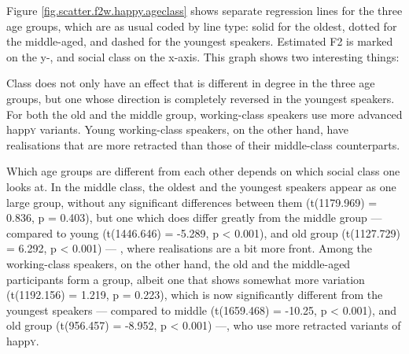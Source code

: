 Figure \ref{fig.scatter.f2w.happy.ageclass} shows separate regression lines for the three age groups, which are as usual coded by line type: solid for the oldest, dotted for the middle-aged, and dashed for the youngest speakers.
Estimated F2 is marked on the y-, and social class on the x-axis.
This graph shows two interesting things:
\begin{inparaenum}[(1)]
	\item Class does not only have an effect that is different in degree in the three age groups, but one whose direction is completely reversed in the youngest speakers.
	For both the old and the middle group, working-class speakers use more advanced happ\textsc{y} variants.
	Young working-class speakers, on the other hand, have realisations that are more retracted than those of their middle-class counterparts.
	\item Which age groups are different from each other depends on which social class one looks at.
	In the middle class, the oldest and the youngest speakers appear as one large group, without any significant differences between them (t(1179.969) = 0.836, p = 0.403), but one which does differ greatly from the middle group --- compared to young (t(1446.646) = -5.289, p < 0.001), and old group (t(1127.729) = 6.292, p < 0.001) --- , where realisations are a bit more front.
	Among the working-class speakers, on the other hand, the old and the middle-aged participants form a group, albeit one that shows somewhat more variation (t(1192.156) = 1.219, p = 0.223), which is now significantly different from the youngest speakers --- compared to middle (t(1659.468) = -10.25, p < 0.001), and old group (t(956.457) = -8.952, p < 0.001) ---, who use more retracted variants of happ\textsc{y}.
\end{inparaenum}


